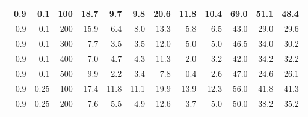 \begin{longtable}{|r|r|r|r|r|r|r|r|r|r|r|r|}
    \hline \
    0.9                            & 0.1                     & 100                       & 18.7                       & 9.7                       & 9.8                       & 20.6                      & 11.8                       & 10.4                       & 69.0                      & 51.1                      & 48.4                      \\
    \hline \
    0.9                            & 0.1                     & 200                       & 15.9                       & 6.4                       & 8.0                       & 13.3                      & 5.8                       & 6.5                       & 43.0                      & 29.0                      & 29.6                      \\
    \hline \
    0.9                            & 0.1                     & 300                       & 7.7                       & 3.5                       & 3.5                       & 12.0                       & 5.0                       & 5.0                       & 46.5                      & 34.0                      & 30.2                      \\
    \hline \
    0.9                            & 0.1                    & 400                       & 7.0                      & 4.7                      & 4.3                      & 11.3                      & 2.0                      & 3.2                      & 42.0                      & 34.2                      & 32.2                      \\
    \hline \
    0.9                            & 0.1                    & 500                       & 9.9                       & 2.2                       & 3.4                       & 7.8                      & 0.4                       & 2.6                       & 47.0                      & 24.6                      & 26.1                      \\
    \hline \
    0.9                            & 0.25                    & 100                       & 17.4                      & 11.8                       & 11.1                       & 19.9                      & 13.9                       & 12.3                       & 56.0                      & 41.8                      & 41.3                      \\
    \hline \
    0.9                            & 0.25                    & 200                       & 7.6                       & 5.5                       & 4.9                       & 12.6                      & 3.7                       & 5.0                       & 50.0                      & 38.2                      & 35.2                      \\

\end{longtable}
